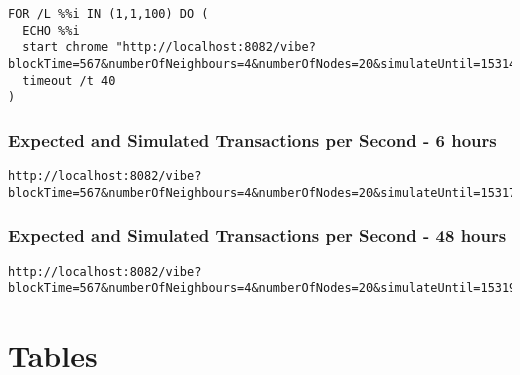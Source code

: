 \begin{appendices}
\begin{minipage}{\linewidth}
\begin{lstlisting}[style=batch]
FOR /L %%i IN (1,1,100) DO (
  ECHO %%i
  start chrome "http://localhost:8082/vibe?blockTime=567&numberOfNeighbours=4&numberOfNodes=20&simulateUntil=1531411943382&transactionSize=1&throughput=105&latency=900&neighboursDiscoveryInterval=3000&maxBlockSize=100&maxBlockWeight=4000&networkBandwidth=1&strategy=BITCOIN_LIKE_BLOCKCHAIN&transactionPropagationDelay=150&hashRate=30&confirmations=6"
  timeout /t 40
)
\end{lstlisting}
\end{minipage}

\subsubsection{Expected and Simulated Transactions per Second - 6 hours\label{6hoursURL}}

\begin{minipage}{\linewidth}
\begin{lstlisting}[style=batch]
http://localhost:8082/vibe?blockTime=567&numberOfNeighbours=4&numberOfNodes=20&simulateUntil=1531752759474&transactionSize=1&throughput=105&latency=900&neighboursDiscoveryInterval=3000&maxBlockSize=100&maxBlockWeight=4000&networkBandwidth=1&strategy=BITCOIN_LIKE_BLOCKCHAIN&transactionPropagationDelay=150&hashRate=0&confirmations=4
\end{lstlisting}
\end{minipage}

\subsubsection{Expected and Simulated Transactions per Second - 48 hours\label{48hoursURL}}

\begin{minipage}{\linewidth}
\begin{lstlisting}[style=batch]
http://localhost:8082/vibe?blockTime=567&numberOfNeighbours=4&numberOfNodes=20&simulateUntil=1531905360000&transactionSize=1&throughput=105&latency=900&neighboursDiscoveryInterval=3000&maxBlockSize=100&maxBlockWeight=4000&networkBandwidth=1&strategy=BITCOIN_LIKE_BLOCKCHAIN&transactionPropagationDelay=150&hashRate=0&confirmations=4
\end{lstlisting}
\end{minipage}

\section{Tables}


\end{appendices}
